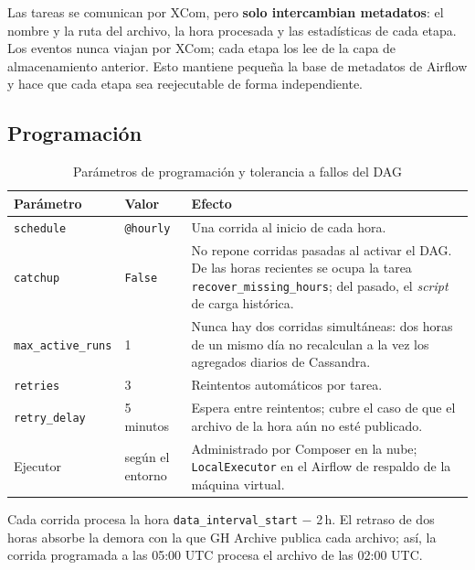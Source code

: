 Las tareas se comunican por XCom, pero \textbf{solo intercambian metadatos}: el nombre y la ruta del archivo, la hora procesada y las estadísticas de cada etapa. Los eventos nunca viajan por XCom; cada etapa los lee de la capa de almacenamiento anterior. Esto mantiene pequeña la base de metadatos de Airflow y hace que cada etapa sea reejecutable de forma independiente.

\subsection{Programación}

\begin{table}[H]
\centering
\caption{Parámetros de programación y tolerancia a fallos del DAG}
\label{tab:dag-params}
\vspace{0.2cm}
\small
\begin{tabular}{@{}llp{7.6cm}@{}}
\toprule
\textbf{Parámetro} & \textbf{Valor} & \textbf{Efecto} \\
\midrule
\texttt{schedule}           & \texttt{@hourly}  & Una corrida al inicio de cada hora. \\
\texttt{catchup}            & \texttt{False}    & No repone corridas pasadas al activar el DAG. De las horas recientes se ocupa la tarea \texttt{recover\_missing\_hours}; del pasado, el \textit{script} de carga histórica. \\
\texttt{max\_active\_runs}  & 1                 & Nunca hay dos corridas simultáneas: dos horas de un mismo día no recalculan a la vez los agregados diarios de Cassandra. \\
\texttt{retries}            & 3                 & Reintentos automáticos por tarea. \\
\texttt{retry\_delay}       & 5 minutos         & Espera entre reintentos; cubre el caso de que el archivo de la hora aún no esté publicado. \\
Ejecutor                    & según el entorno & Administrado por Composer en la nube; \texttt{LocalExecutor} en el Airflow de respaldo de la máquina virtual. \\
\bottomrule
\end{tabular}
\end{table}

Cada corrida procesa la hora \texttt{data\_interval\_start} $-$ 2\,h. El retraso de dos horas absorbe la demora con la que GH Archive publica cada archivo; así, la corrida programada a las 05:00 UTC procesa el archivo de las 02:00 UTC.

